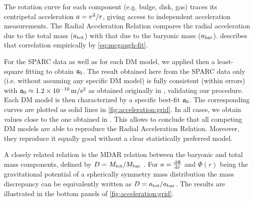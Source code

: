 The rotation curve for each component (e.g. bulge, disk, gas) traces its centripetal acceleration $a = v^2/r$, giving access to independent acceleration measurements. The Radial Acceleration Relation compares the radial acceleration due to the total mass ($a_\mathrm{tot}$) with that due to the baryonic mass ($a_\mathrm{bar}$). \citet{2016PhRvL.117t1101M} describes that correlation empirically by \cref{eq:mcgaugh-fit}.


For the SPARC data as well as for each DM model, we applied then a least-square fitting to obtain $\mathfrak{a}_0$. The result obtained here from the SPARC data only (i.e. without assuming any specific DM model) is fully consistent (within errors) with $\mathfrak{a}_0 \approx \SI{1.2E-10}{\metre\per\second^2}$ as obtained originally in \citet{2016PhRvL.117t1101M}, validating our procedure. Each DM model is then characterized by a specific best-fit $\mathfrak{a}_0$. The corresponding curves are plotted as solid lines in \cref{fig:acceleration:grid}. In all cases, we obtain values close to the one obtained in \citet{2016PhRvL.117t1101M}. This allows to conclude that all competing DM models are able to reproduce the Radial Acceleration Relation. Moreover, they reproduce it equally good without a clear statistically preferred model.

A closely related relation is the MDAR relation between the baryonic and total mass components, defined by $D = M_{\rm tot}/M_{\rm bar}$ . For $a = \frac{\mathrm{d}\Phi}{\mathrm{d} r}$ and $\Phi(r)$ being the gravitational potential of a spherically symmetry mass distribution the mass discrepancy can be equivalently written as $D = a_\mathrm{tot}/a_\mathrm{bar}$. The results are illustrated in the bottom panels of \cref{fig:acceleration:grid}.

